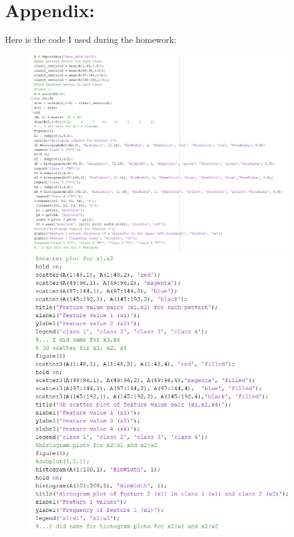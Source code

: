 \documentclass[a4paper,12pt]{article}
\begin{document}
\section*{Appendix:}
Here is the code I used during the homework:
\begin{figure}[H]

\includegraphics[scale=0.48]{matlab_code_1.jpg}
\includegraphics[scale=0.48]{matlab_code_2.jpg}

\end{figure}
\end{document}
